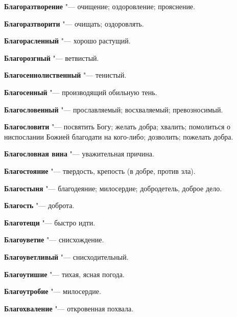\begin{mymulticols}{2}
\noindent\textbf{Благоразтворение} "--- очищение; оздоровление; прояснение. 




\noindent\textbf{Благоразтворити} "--- очищать; оздоровлять. 




\noindent\textbf{Благорасленный} "--- хорошо растущий. 




\noindent\textbf{Благорозгный} "--- ветвистый. 




\noindent\textbf{Благосеннолиственный} "--- тенистый. 




\noindent\textbf{Благосенный} "--- производящий обильную тень. 




\noindent\textbf{Благословенный} "--- прославляемый; восхваляемый; превозносимый. 




\noindent\textbf{Благословити} "--- посвятить Богу; желать добра; хвалить; помолиться о ниспослании Божией благодати на кого-либо; дозволить; пожелать добра. 




\noindent\textbf{Благословная вина} "--- уважительная причина. 




\noindent\textbf{Благостояние} "--- твердость, крепость (в добре, против зла). 




\noindent\textbf{Благостыня} "--- благодеяние; милосердие; добродетель, доброе дело. 




\noindent\textbf{Благость} "--- доброта. 




\noindent\textbf{Благотещи} "--- быстро идти. 




\noindent\textbf{Благоуветие} "--- снисхождение. 




\noindent\textbf{Благоуветливый} "--- снисходительный. 




\noindent\textbf{Благоутишие} "--- тихая, ясная погода. 




\noindent\textbf{Благоутробие} "--- милосердие. 




\noindent\textbf{Благохваление} "--- откровенная похвала. 





\end{mymulticols}
